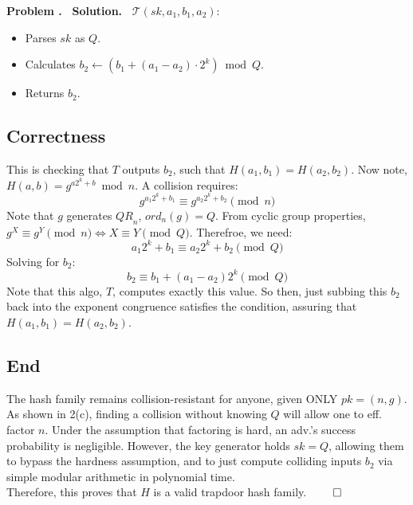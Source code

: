 \documentclass[12pt]{article}
\theoremstyle{definition}
\newcommand{\addbigskip}{\addvspace{\bigskipamount}}
\newcounter{problemnum}
\newenvironment{problem}
     {\addbigskip \setcounter{partnum}{0}
      \noindent\stepcounter{problemnum}\textbf{Problem
                                             \arabic{problemnum}.\ }}
     {\par\addbigskip}
\newenvironment{solution}
     {\addbigskip
      \noindent\color{blue}\textbf{Solution.\ }}
     {\par\addbigskip}
\newenvironment{solution}
     {\comment}
     {\endcomment}
\newcounter{partnum}
\newcommand{\pk}{\mathit{pk}}
\newcommand{\sk}{\mathit{sk}}
\newcommand{\qrn}{\mathit{QR}_n}
\newcommand{\T}{\mathcal{T}}
\begin{document}
\begin{problem}
\begin{solution}
\noindent $\T(\sk, a_1, b_1, a_2)$:
\begin{itemize}
    \item Parses $\sk$ as $Q$.
    \item Calculates $b_2 \leftarrow \left(b_1 + (a_1 - a_2) \cdot 2^k\right) \bmod Q$.
    \item Returns $b_2$.
\end{itemize}

\subsection*{Correctness}
This is checking that $T$ outputs $b_2$, such that $H(a_1, b_1) = H(a_2, b_2)$.
Now note, $H(a,b) = g^{a 2^k + b} \bmod n$. A collision requires:
\begin{equation*}
g^{a_1 2^k + b_1} \equiv g^{a_2 2^k + b_2} \pmod n
\end{equation*}
Note that $g$ generates $\qrn$, $ord_n(g) = Q$. From cyclic group properties, $g^X \equiv g^Y \pmod n \iff X \equiv Y \pmod Q$. Therefroe, we need:
\begin{equation*}
a_1 2^k + b_1 \equiv a_2 2^k + b_2 \pmod Q
\end{equation*}
Solving for $b_2$:
\begin{equation*}
b_2 \equiv b_1 + (a_1 - a_2) 2^k \pmod Q
\end{equation*}
Note that this algo, $T$, computes exactly this value. So then, just subbing this $b_2$ back into the exponent congruence satisfies the condition, assuring that $H(a_1, b_1) = H(a_2, b_2)$.

\subsection*{End}
The hash family remains collision-resistant for anyone, given ONLY $\pk = (n, g)$. As shown in 2(c), finding a collision without knowing $Q$ will allow one to eff. factor $n$. Under the assumption that factoring is hard, an adv.'s success probability is negligible. However, the key generator holds $\sk = Q$, allowing them to bypass the hardness assumption, and to just compute colliding inputs $b_2$ via simple modular arithmetic in polynomial time.\\
\indent Therefore, this proves that $H$ is a valid trapdoor hash family. $\qed$
\end{solution}

\end{problem}
\end{document}
